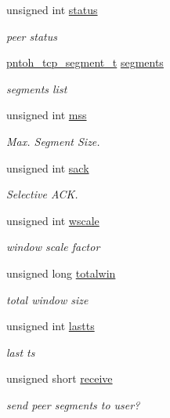 \begin{DoxyCompactItemize}
unsigned int \hyperlink{structntoh__tcp__peer__t_aeed08ea57af6f7be240e2bf66162389f}{status}
\begin{DoxyCompactList}\small\item\em peer status \end{DoxyCompactList}\item 
\hyperlink{tcpreassembly_8h_a1f60f4065e8694dbf82c9896925295b3}{pntoh\-\_\-tcp\-\_\-segment\-\_\-t} \hyperlink{structntoh__tcp__peer__t_ade44d6ced1b5a51caac1af66150b610c}{segments}
\begin{DoxyCompactList}\small\item\em segments list \end{DoxyCompactList}\item 
unsigned int \hyperlink{structntoh__tcp__peer__t_a71381dd15a96b081986e0c98e1e75f90}{mss}
\begin{DoxyCompactList}\small\item\em Max. Segment Size. \end{DoxyCompactList}\item 
unsigned int \hyperlink{structntoh__tcp__peer__t_a083c3c3c4c7eb53663cd15317b55872b}{sack}
\begin{DoxyCompactList}\small\item\em Selective A\-C\-K. \end{DoxyCompactList}\item 
unsigned int \hyperlink{structntoh__tcp__peer__t_a648feb18271d5c1fe600c6bf7875478c}{wscale}
\begin{DoxyCompactList}\small\item\em window scale factor \end{DoxyCompactList}\item 
unsigned long \hyperlink{structntoh__tcp__peer__t_af40364d83cae85562184a8bee797ae6c}{totalwin}
\begin{DoxyCompactList}\small\item\em total window size \end{DoxyCompactList}\item 
unsigned int \hyperlink{structntoh__tcp__peer__t_a2eb3b9494c999b0dd38c4d40bfdc55b4}{lastts}
\begin{DoxyCompactList}\small\item\em last ts \end{DoxyCompactList}\item 
unsigned short \hyperlink{structntoh__tcp__peer__t_a51b032f0cfd74b0bdbcf8294f1f7d7b7}{receive}
\begin{DoxyCompactList}\small\item\em send peer segments to user? \end{DoxyCompactList}\end{DoxyCompactItemize}


